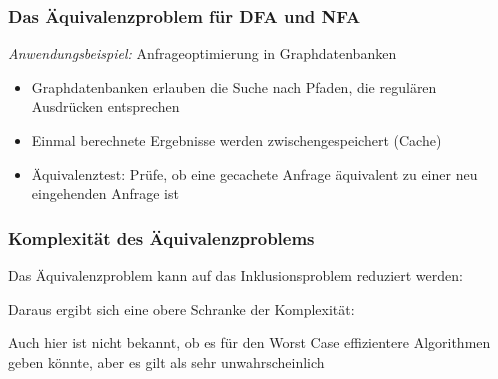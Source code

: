 \documentclass[aspectratio=1610,onlymath]{beamer}
\begin{document}
\begin{frame}\frametitle{Das Äquivalenzproblem für DFA und NFA}


\emph{Anwendungsbeispiel:}
Anfrageoptimierung in Graphdatenbanken
\begin{itemize}
\item Graphdatenbanken erlauben die Suche nach Pfaden, die regulären Ausdrücken entsprechen
\item Einmal berechnete Ergebnisse werden zwischengespeichert (Cache)
\item Äquivalenztest: Prüfe, ob eine gecachete Anfrage äquivalent zu einer neu eingehenden Anfrage ist
\end{itemize}

\end{frame}

\begin{frame}\frametitle{Komplexität des Äquivalenzproblems}

Das Äquivalenzproblem kann auf das Inklusionsproblem reduziert werden:\\[1ex]

\bigskip

Daraus ergibt sich eine obere Schranke der Komplexität:


Auch hier ist nicht bekannt, ob es für den Worst Case effizientere Algorithmen geben könnte, aber es gilt als sehr unwahrscheinlich

\end{frame}
\end{document}
